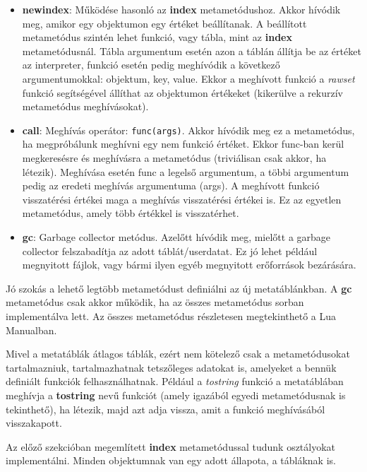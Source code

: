 \begin{itemize}
	\item \detokenize{__}\textbf{newindex}: Működése hasonló az \detokenize{__}\textbf{index} metametódushoz. Akkor hívódik meg, amikor egy objektumon egy \texttt{} értéket beállítanak. A beállított metametódus szintén lehet funkció, vagy tábla, mint az \detokenize{__}\textbf{index} metametódusnál. Tábla argumentum esetén azon a táblán állítja be az értéket az interpreter, funkció esetén pedig meghívódik a következő argumentumokkal: objektum, key, value. Ekkor a meghívott funkció a \textit{rawset} funkció segítségével állíthat az objektumon értékeket (kikerülve a rekurzív metametódus meghívásokat).
	\item \detokenize{__}\textbf{call}: Meghívás operátor: \texttt{func(args)}. Akkor hívódik meg ez a metametódus, ha megpróbálunk meghívni egy nem funkció értéket. Ekkor func-ban kerül megkeresésre és meghívásra a metametódus (triviálisan csak akkor, ha létezik). Meghívása esetén func a legelső argumentum, a többi argumentum pedig az eredeti meghívás argumentuma (args). A meghívott funkció visszatérési értékei maga a meghívás visszatérési értékei is. Ez az egyetlen metametódus, amely több értékkel is visszatérhet.
	\item \detokenize{__}\textbf{gc}: Garbage collector metódus. Azelőtt hívódik meg, mielőtt a garbage collector felszabadítja az adott táblát/userdatat. Ez jó lehet például megnyitott fájlok, vagy bármi ilyen egyéb megnyitott erőforrások bezárására.
\end{itemize}

Jó szokás a lehető legtöbb metametódust definiálni az új metatáblánkban. A \detokenize{__}\textbf{gc} metametódus csak akkor működik, ha az összes metametódus sorban implementálva lett. Az összes metametódus részletesen megtekinthető a Lua Manualban.

Mivel a metatáblák átlagos táblák, ezért nem kötelező csak a metametódusokat tartalmazniuk, tartalmazhatnak tetszőleges adatokat is, amelyeket a bennük definiált funkciók felhasználhatnak. Például a \textit{tostring} funkció a metatáblában meghívja a \detokenize{__}\textbf{tostring} nevű funkciót (amely igazából egyedi metametódusnak is tekinthető), ha létezik, majd azt adja vissza, amit a funkció meghívásából visszakapott. \cite{metatable1}

\pagebreak


Az előző szekcióban megemlített \detokenize{__}\textbf{index} metametódussal tudunk osztályokat implementálni. Minden objektumnak van egy adott állapota, a tábláknak is.

